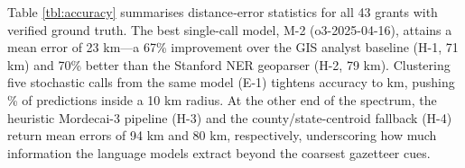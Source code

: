 Table \ref{tbl:accuracy} summarises distance‐error statistics for all 43
grants with verified ground truth. The best single-call model, M-2
(o3-2025-04-16), attains a mean error of 23 km---a 67\% improvement over
the GIS analyst baseline (H-1, 71 km) and 70\% better than the Stanford
NER geoparser (H-2, 79 km). Clustering five stochastic calls from the
same model (E-1) tightens accuracy to \DIFdelbegin {}\DIFdelend \DIFaddbegin {}\DIFaddend km, pushing \DIFdelbegin {}\DIFdelend \DIFaddbegin {}\DIFaddend \% of
predictions inside a 10 km radius. At the other end of the spectrum, the
heuristic Mordecai-3 pipeline (H-3) and the county/state-centroid
fallback (H-4) return mean errors of 94 km and 80 km, respectively,
underscoring how much information the language models extract beyond the
coarsest gazetteer cues.

